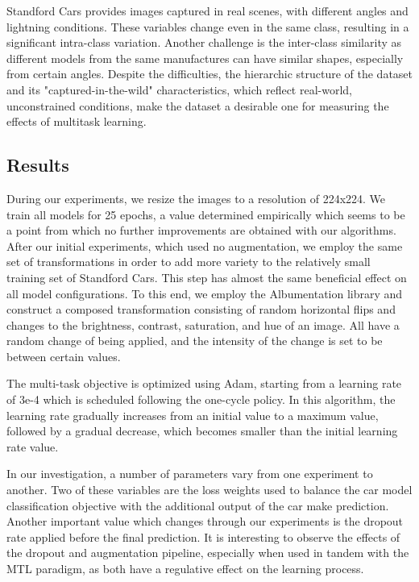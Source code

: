 \documentclass[conference]{IEEEtran}
\begin{document}

Standford Cars provides images captured in real scenes, with different angles and lightning conditions. These variables change even in the same class, resulting in a significant intra-class variation. Another challenge is the inter-class similarity as different models from the same manufactures can have similar shapes, especially from certain angles. Despite the difficulties, the hierarchic structure of the dataset and its "captured-in-the-wild" characteristics,  which reflect real-world, unconstrained conditions, make the dataset a desirable one for measuring the effects of multitask learning. 

\subsection{Results}

During our experiments, we resize the images to a resolution of 224x224. We train all models for 25 epochs, a value determined empirically which seems to be a point from which no further improvements are obtained with our algorithms. After our initial experiments, which used no augmentation, we employ the same set of transformations in order to add more variety to the relatively small training set of Standford Cars. This step has almost the same beneficial effect on all model configurations. To this end, we employ the Albumentation library \cite{buslaev2020albumentations} and construct a composed transformation consisting of random horizontal flips and changes to the brightness, contrast, saturation, and hue of an image. All have a random change of being applied, and the intensity of the change is set to be between certain values. 

The multi-task objective is optimized using Adam, starting from a learning rate of 3e-4 which is scheduled following the one-cycle \cite{smith2019super} policy. In this algorithm, the learning rate gradually increases from an initial value to a maximum value, followed by a gradual decrease, which becomes smaller than the initial learning rate value. 

In our investigation, a number of parameters vary from one experiment to another. Two of these variables are the loss weights used to balance the car model classification objective with the additional output of the car make prediction. Another important value which changes through our experiments is the dropout rate applied before the final prediction. It is interesting to observe the effects of the dropout and augmentation pipeline, especially when used in tandem with the MTL paradigm, as both have a regulative effect on the learning process. 
\end{document}
